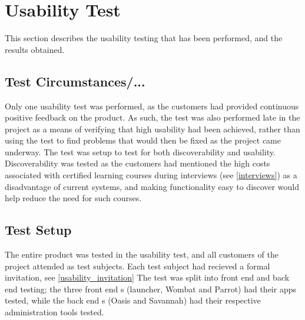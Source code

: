 \section{Usability Test}
This section describes the usability testing that has been performed, and the results obtained. 

\subsection{Test Circumstances/...}
Only one usability test was performed, as the customers had provided continuous positive feedback on the product. 
As such, the test was also performed late in the project as a means of verifying that high usability had been achieved, rather than using the test to find problems that would then be fixed as the project came underway. \newline
The test was setup to test for both discoverability and usability. 
Discoverability was tested as the customers had mentioned the high costs associated with certified learning courses during interviews (see \autoref{interviews}) as a disadvantage of current systems, and making functionality easy to discover would help reduce the need for such courses.

\subsection{Test Setup}
The entire \giraf[] product was tested in the usability test, and all customers of the project attended as test subjects. 
Each test subject had recieved a formal invitation, see \autoref{usability_invitation}
The test was split into front end and back end testing; the three front end \localgroup[]s (launcher, Wombat and Parrot) had their apps tested, while the back end \localgroup[]s (Oasis and Savannah) had their respective administration tools tested. 
